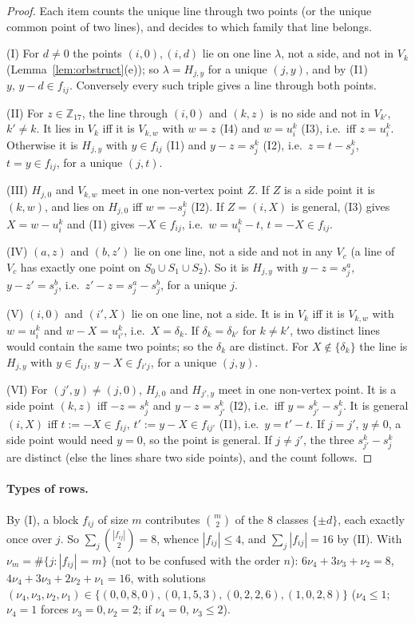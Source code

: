 \documentclass[11pt,a4paper]{article}
\theoremstyle{definition}
\newcommand{\Zp}{\mathbb{Z}_{17}}
\begin{document}
\begin{proof}
Each item counts the unique line through two points (or the unique common point of two lines), and decides to which family that line belongs.

(I) For $d\ne0$ the points $(i,0),(i,d)$ lie on one line $\lambda$, not a side, and not in $V_k$ (Lemma~\ref{lem:orbstruct}(e)); so $\lambda=H_{j,y}$ for a unique $(j,y)$, and by (I1) $y,\,y-d\in f_{ij}$. Conversely every such triple gives a line through both points.

(II) For $z\in\Zp$, the line through $(i,0)$ and $(k,z)$ is no side and not in $V_{k'}$, $k'\ne k$. It lies in $V_k$ iff it is $V_{k,w}$ with $w=z$ (I4) and $w=u^k_i$ (I3), i.e.\ iff $z=u^k_i$. Otherwise it is $H_{j,y}$ with $y\in f_{ij}$ (I1) and $y-z=s^k_j$ (I2), i.e.\ $z=t-s^k_j$, $t=y\in f_{ij}$, for a unique $(j,t)$.

(III) $H_{j,0}$ and $V_{k,w}$ meet in one non-vertex point $Z$. If $Z$ is a side point it is $(k,w)$, and lies on $H_{j,0}$ iff $w=-s^k_j$ (I2). If $Z=(i,X)$ is general, (I3) gives $X=w-u^k_i$ and (I1) gives $-X\in f_{ij}$, i.e.\ $w=u^k_i-t$, $t=-X\in f_{ij}$.

(IV) $(a,z)$ and $(b,z')$ lie on one line, not a side and not in any $V_c$ (a line of $V_c$ has exactly one point on $S_0\cup S_1\cup S_2$). So it is $H_{j,y}$ with $y-z=s^a_j$, $y-z'=s^b_j$, i.e.\ $z'-z=s^a_j-s^b_j$, for a unique $j$.

(V) $(i,0)$ and $(i',X)$ lie on one line, not a side. It is in $V_k$ iff it is $V_{k,w}$ with $w=u^k_i$ and $w-X=u^k_{i'}$, i.e.\ $X=\delta_k$. If $\delta_k=\delta_{k'}$ for $k\ne k'$, two distinct lines would contain the same two points; so the $\delta_k$ are distinct. For $X\notin\{\delta_k\}$ the line is $H_{j,y}$ with $y\in f_{ij}$, $y-X\in f_{i'j}$, for a unique $(j,y)$.

(VI) For $(j',y)\ne(j,0)$, $H_{j,0}$ and $H_{j',y}$ meet in one non-vertex point. It is a side point $(k,z)$ iff $-z=s^k_j$ and $y-z=s^k_{j'}$ (I2), i.e.\ iff $y=s^k_{j'}-s^k_j$. It is general $(i,X)$ iff $t:=-X\in f_{ij}$, $t':=y-X\in f_{ij'}$ (I1), i.e.\ $y=t'-t$. If $j=j'$, $y\ne0$, a side point would need $y=0$, so the point is general. If $j\ne j'$, the three $s^k_{j'}-s^k_j$ are distinct (else the lines share two side points), and the count follows.
\end{proof}

\paragraph{Types of rows.} By (I), a block $f_{ij}$ of size $m$ contributes $\binom m2$ of the $8$ classes $\{\pm d\}$, each exactly once over $j$. So $\sum_j\binom{|f_{ij}|}2=8$, whence $|f_{ij}|\le4$, and $\sum_j|f_{ij}|=16$ by (II). With $\nu_m=\#\{j:|f_{ij}|=m\}$ (not to be confused with the order $n$): $6\nu_4+3\nu_3+\nu_2=8$, $4\nu_4+3\nu_3+2\nu_2+\nu_1=16$, with solutions $(\nu_4,\nu_3,\nu_2,\nu_1)\in\{(0,0,8,0),(0,1,5,3),(0,2,2,6),(1,0,2,8)\}$ ($\nu_4\le1$; $\nu_4=1$ forces $\nu_3=0,\nu_2=2$; if $\nu_4=0$, $\nu_3\le2$).
\end{document}
